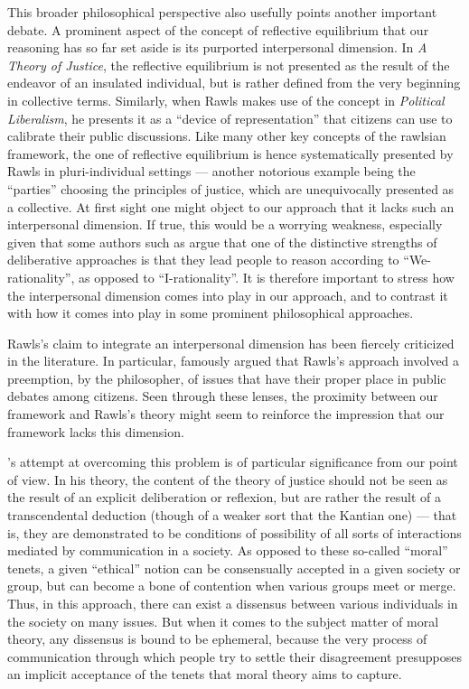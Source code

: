 \documentclass[version=3.21, pagesize, twoside=off, bibliography=totoc, DIV=calc, fontsize=12pt, a4paper, french, english]{scrartcl}
\begin{document}
This broader philosophical perspective also usefully points another important debate. 
A prominent aspect of the concept of reflective equilibrium that our reasoning has so far set aside is its purported interpersonal dimension. 
In \emph{A Theory of Justice}, the reflective equilibrium is not presented as the result of the endeavor of an insulated individual, but is rather defined from the very beginning in collective terms. 
Similarly, when Rawls makes use of the concept in \emph{Political Liberalism}, he presents it as a  “device of representation” that citizens can use to calibrate their public discussions. 
Like many other key concepts of the rawlsian framework, the one of reflective equilibrium is hence systematically presented by Rawls in pluri-individual settings --- another notorious example being the “parties” choosing the principles of justice, which are unequivocally presented as a collective. 
At first sight one might object to our approach that it lacks such an interpersonal dimension.
If true, this would be a worrying weakness, especially given that some authors such as \citet{vatn_institutional_2009} argue that one of the distinctive strengths of deliberative approaches is that they lead people to reason according to ``We-rationality'', as opposed to ``I-rationality''. 
It is therefore important to stress how the interpersonal dimension comes into play in our approach, and to contrast it with how it comes into play in some prominent philosophical approaches.

Rawls's claim to integrate an interpersonal dimension has been fiercely criticized in the literature. 
In particular, \citet{habermas_short_1999} famously argued that Rawls's approach involved a preemption, by the philosopher, of issues that have their proper place in public debates among citizens. 
Seen through these lenses, the proximity between our framework and Rawls's theory might seem to reinforce the impression that our framework lacks this dimension.

\citeauthor{habermas_moralbewustsein_1983}'s \citeyearpar{habermas_moralbewustsein_1983} attempt at overcoming this problem is of particular significance from our point of view. 
In his theory, the content of the theory of justice should not be seen as the result of an explicit deliberation or reflexion, but are rather the result of a transcendental deduction (though of a weaker sort that the Kantian one) --- that is, they are demonstrated to be conditions of possibility of all sorts of interactions mediated by communication in a society. As opposed to these so-called “moral” tenets, a given “ethical” notion can be consensually accepted in a given society or group, but can become a bone of contention when various groups meet or merge. 
Thus, in this approach, there can exist a dissensus between various individuals in the society on many issues. 
But when it comes to the subject matter of moral theory, any dissensus is bound to be ephemeral, because the very process of communication through which people try to settle their disagreement presupposes an implicit acceptance of the tenets that moral theory aims to capture.
\end{document}
